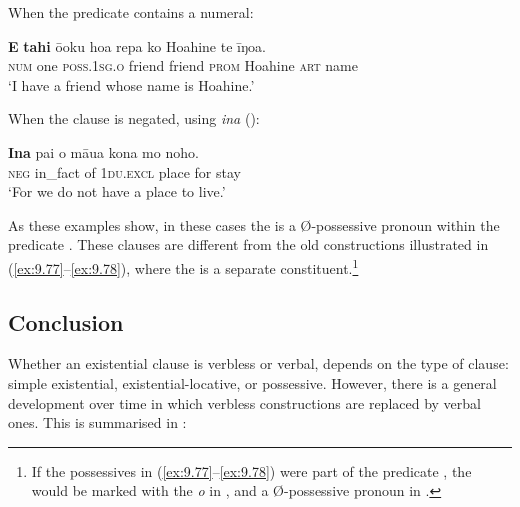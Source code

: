 When the predicate  contains a numeral:

\ea\label{ex:9.79}
\gll \textbf{E} \textbf{tahi} ō{\ꞌ}oku hoa repa ko Hoahine te {\ꞌ}īŋoa.\\
\textsc{num} one \textsc{poss.1sg.o} friend friend \textsc{prom} Hoahine \textsc{art} name\\

\glt
‘I have a friend whose name is Hoahine.’ \textstyleExampleref{[R213.014]} 
\z

When the clause is negated, using \textit{{\ꞌ}ina} ():

\ea\label{ex:9.80}
\gll {\ꞌ}\textbf{Ina} pa{\ꞌ}i o māua kona mo noho. \\
\textsc{neg} in\_fact of \textsc{1du.excl} place for stay \\

\glt
‘For we do not have a place to live.’ \textstyleExampleref{[R229.210]} 
\z

As these examples show, in these cases the  is a Ø-possessive pronoun within the predicate . These clauses are different from the old constructions illustrated in (\ref{ex:9.77}–\ref{ex:9.78}), where the  is a separate constituent.\footnote{\label{fn:478}If the possessives in (\ref{ex:9.77}–\ref{ex:9.78}) were part of the predicate , the  would be marked with the  \textit{o} in , and a Ø-possessive pronoun in .} 
\subsection{Conclusion}\label{sec:9.3.4}

Whether an existential clause is verbless or verbal, depends on the type of clause: simple existential, existential-locative, or possessive. However, there is a general development over time in which verbless constructions are replaced by verbal ones. This is summarised in :

\newpage
\begin{table}
\caption{Types of existential clauses}
\label{tab:63}
\end{table}

